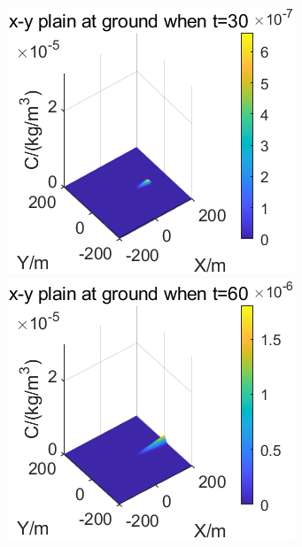 \documentclass{article}
\begin{document}
	\begin{figure}[htbp]
		\begin{minipage}{0.33\textwidth}
			\includegraphics[width=\textwidth]{pics/v=4,t=30.png}
		\end{minipage}
		\begin{minipage}{0.33\textwidth}
			\includegraphics[width=\textwidth]{pics/v=4,t=60.png}

\end{minipage}
\end{figure}
\end{document}
